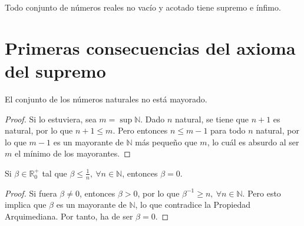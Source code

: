 \begin{coro}
    Todo conjunto de números reales no vacío y acotado tiene supremo e ínfimo.
\end{coro}


\section{Primeras consecuencias del axioma del supremo}
\begin{teo}
    El conjunto de los números naturales no está mayorado.
\end{teo}
\begin{proof}
    Si lo estuviera, sea $m = \sup \mathbb{N}$. Dado $n$ natural, se tiene que $n+1$ es natural, por lo que $n+1 \leq m$. Pero entonces $n \leq m-1$ para todo $n$ natural, por lo que $m-1$ es un mayorante de $\mathbb{N}$ más pequeño que $m$, lo cuál es absurdo al ser $m$ el mínimo de los mayorantes.
\end{proof}
\begin{coro}
    Si $\beta \in \mathbb{R}^{+}_0$ tal que $\beta \leq \frac{1}{n},~ \forall n \in \mathbb{N}$, entonces $\beta = 0$.
\end{coro}
\begin{proof}
    Si fuera $\beta \neq 0$, entonces $\beta > 0$, por lo que $\beta^{-1} \geq n, ~\forall n \in \mathbb{N}$. Pero esto implica que $\beta$ es un mayorante de $\mathbb{N}$, lo que contradice la Propiedad Arquimediana. Por tanto, ha de ser $\beta = 0$.
\end{proof}

